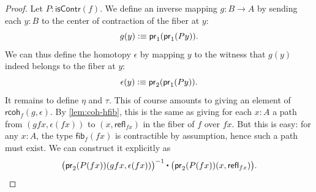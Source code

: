 \documentclass[10pt,a4paper]{article}
\newcommand{\defeq}{\vcentcolon\equiv}  %
\newcommand{\proj}[1]{\ensuremath{\mathsf{pr}_{#1}}\xspace}
\newcommand{\refl}[1]{\ensuremath{\mathsf{refl}_{#1}}\xspace}
\newcommand{\ct}{%
  \mathchoice{\mathbin{\raisebox{0.5ex}{$\displaystyle\centerdot$}}}%
             {\mathbin{\raisebox{0.5ex}{$\centerdot$}}}%
             {\mathbin{\raisebox{0.25ex}{$\scriptstyle\,\centerdot\,$}}}%
             {\mathbin{\raisebox{0.1ex}{$\scriptscriptstyle\,\centerdot\,$}}}
}
\newcommand{\opp}[1]{\mathord{{#1}^{-1}}}
\newcommand{\rcoh}[3]{\mathsf{rcoh}_{#1}(#2,#3)}
\newcommand{\hfib}[2]{{\mathsf{fib}}_{#1}(#2)}
\newcommand{\iscontr}{\ensuremath{\mathsf{isContr}}}
\theoremstyle{definition}
\theoremstyle{remark}
\numberwithin{equation}{section}
\begin{document}
\begin{proof}
Let $P : \iscontr(f)$. We define an inverse mapping $g : B \to A$ by sending each $y : B$ to the center of contraction of the fiber at $y$:
\[ g(y) \defeq \proj{1}(\proj{1}(Py)). \]
We can thus define the homotopy $\epsilon$ by mapping $y$ to the witness that $g(y)$ indeed belongs to the fiber at $y$:
\[ \epsilon(y) \defeq \proj{2}(\proj{1}(P y)). \]
It remains to define $\eta$ and $\tau$. This of course amounts to giving an element of $\rcoh{f}{g}{\epsilon}$. By \cref{lem:coh-hfib}, this is the same as giving for each $x:A$ a path from $(gfx,\epsilon(fx))$ to $(x,\refl{fx})$ in the fiber of $f$ over $fx$. But this is easy: for any $x : A$, the type $\hfib{f}{fx}$
is contractible by assumption, hence such a path must exist. We can construct it explicitly as
\[\opp{\big(\proj{2}(P(fx))(gfx,\epsilon(fx))\big)} \ct \big(\proj{2}(P(fx)) (x,\refl{fx})\big). \qedhere \]
\end{proof}
\end{document}
